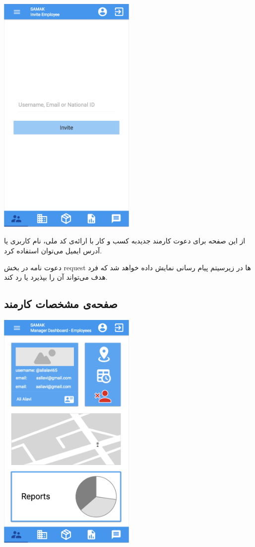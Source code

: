 \begin{center}
\includegraphics[width = 0.5\textwidth]{images/10-new-employee.png}
\end{center}

از این صفحه برای دعوت کارمند جدیدبه کسب و کار با ارائه‌ی کد ملی، نام کاربری یا آدرس ایمیل می‌توان استفاده کرد.

دعوت نامه در بخش request  ها در زیرسیتم پیام رسانی نمایش داده خواهد شد که فرد هدف می‌تواند آن را بپذیرد یا رد کند.


\subsection{صفحه‌ی مشخصات کارمند }

\begin{center}
\includegraphics[width = 0.5\textwidth]{images/11-employee-details.png}
\end{center}

